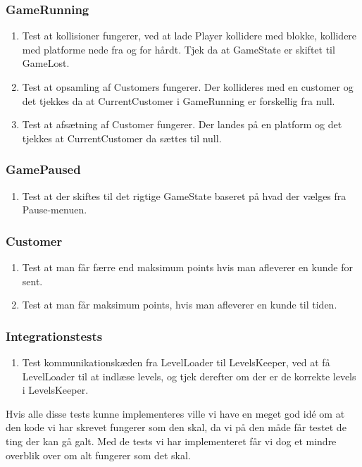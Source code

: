    \subsubsection{GameRunning}
      \begin{enumerate}
         \item Test at kollisioner fungerer, ved at lade Player kollidere med blokke, kollidere med platforme nede fra og for hårdt. Tjek da at GameState er skiftet til GameLost. 
         \item Test at opsamling af Customers fungerer. Der kollideres med en customer og det tjekkes da at CurrentCustomer i GameRunning er forskellig fra null.
         \item Test at afsætning af Customer fungerer. Der landes på en platform og det tjekkes at CurrentCustomer da sættes til null.
      \end{enumerate}
   \subsubsection{GamePaused}
      \begin{enumerate}
         \item Test at der skiftes til det rigtige GameState baseret på hvad der vælges fra Pause-menuen.
      \end{enumerate}
   \subsubsection{Customer}
      \begin{enumerate}
         \item Test at man får færre end maksimum points hvis man afleverer en kunde for sent.
         \item Test at man får maksimum points, hvis man afleverer en kunde til tiden.
      \end{enumerate}
   \subsubsection{Integrationstests}
      \begin{enumerate}
         \item Test kommunikationskæden fra LevelLoader til LevelsKeeper, ved at få LevelLoader til at indlæse levels, og tjek derefter om der er de korrekte levels i LevelsKeeper.
      \end{enumerate}
      Hvis alle disse tests kunne implementeres ville vi have en meget god idé om at den kode vi har skrevet fungerer som den skal, da vi på den måde får testet de ting der kan gå galt. Med de tests vi har implementeret får vi dog et mindre overblik over om alt fungerer som det skal.
      